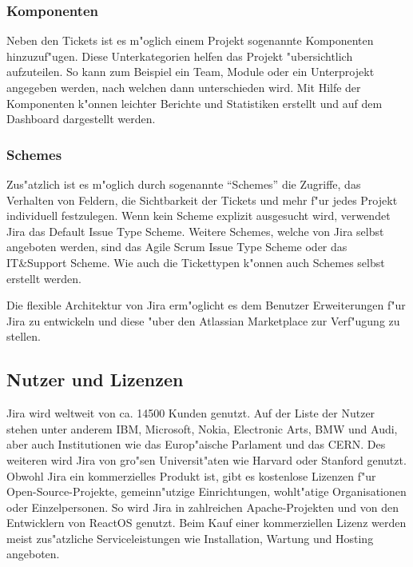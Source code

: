 \subsubsection{Komponenten}
Neben den Tickets ist es m"oglich einem Projekt sogenannte Komponenten hinzuzuf"ugen. Diese Unterkategorien helfen das Projekt "ubersichtlich aufzuteilen. So kann zum Beispiel ein Team, Module oder ein Unterprojekt angegeben werden, nach welchen dann unterschieden wird. Mit Hilfe der Komponenten k"onnen leichter Berichte und Statistiken erstellt und auf dem Dashboard dargestellt werden.

\subsubsection{Schemes} 
Zus"atzlich ist es m"oglich durch sogenannte ``Schemes'' die Zugriffe, das Verhalten von Feldern, die Sichtbarkeit der Tickets und mehr f"ur jedes Projekt individuell festzulegen. Wenn kein Scheme explizit ausgesucht wird, verwendet Jira das Default Issue Type Scheme. Weitere Schemes, welche von Jira selbst angeboten werden, sind das Agile Scrum Issue Type Scheme oder das IT\&Support Scheme. Wie auch die Tickettypen k"onnen auch Schemes selbst erstellt werden.

Die flexible Architektur von Jira erm"oglicht es dem Benutzer Erweiterungen f"ur Jira zu entwickeln und diese "uber den Atlassian Marketplace zur Verf"ugung zu stellen.

\subsection{Nutzer und Lizenzen}
Jira wird weltweit  von ca. 14500 Kunden genutzt. Auf der Liste der Nutzer stehen unter anderem IBM, Microsoft, Nokia, Electronic Arts, BMW und Audi, aber auch Institutionen wie das Europ"aische Parlament und das CERN. Des weiteren wird Jira von gro"sen Universit"aten wie Harvard oder Stanford genutzt. Obwohl Jira ein kommerzielles Produkt ist, gibt es kostenlose Lizenzen f"ur Open-Source-Projekte, gemeinn"utzige Einrichtungen, wohlt"atige Organisationen oder Einzelpersonen. So wird Jira in zahlreichen Apache-Projekten und von den Entwicklern von ReactOS genutzt. Beim Kauf einer kommerziellen Lizenz werden meist zus"atzliche Serviceleistungen wie Installation, Wartung und Hosting angeboten.
